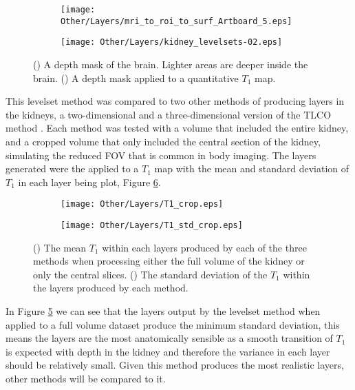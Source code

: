 \begin{figure}[H]
	\centering
	\begin{subfigure}[c]{0.47\textwidth}
		\centering
		\texttt{[image: Other/Layers/mri\_to\_roi\_to\_surf\_Artboard\_5.eps]}
		\caption{}
		\label{fig:layers_brain}
	\end{subfigure}
	\hfill
	\begin{subfigure}[c]{0.47\textwidth}
		\centering
		\texttt{[image: Other/Layers/kidney\_levelsets-02.eps]}
		\caption{}
		\label{fig:layers_kidney}
	\end{subfigure}
	\caption{() A depth mask of the brain. Lighter areas are deeper inside the brain. () A depth mask applied to a quantitative $T_1$ map.}
	\label{fig:layers_example}
\end{figure}

This levelset method was compared to two other methods of producing layers in the kidneys, a two-dimensional and a three-dimensional version of the \ac{TLCO} method \cite{piskunowicz_new_2015, milani_reduction_2017}. Each method was tested with a volume that included the entire kidney, and a cropped volume that only included the central section of the kidney, simulating the reduced \ac{FOV} that is common in body imaging. The layers generated were the applied to a $T_1$ map with the mean and standard deviation of $T_1$ in each layer being plot, Figure \ref{fig:layers_comp}.

\begin{figure}[H]
	\centering
	\begin{subfigure}[c]{0.47\textwidth}
		\centering
		\texttt{[image: Other/Layers/T1\_crop.eps]}
		\caption{}
		\label{fig:layers_t1_comp}
	\end{subfigure}
	\hfill
	\begin{subfigure}[c]{0.47\textwidth}
		\centering
		\texttt{[image: Other/Layers/T1\_std\_crop.eps]}
		\caption{}
		\label{fig:layers_t1_std_comp}
	\end{subfigure}
	\caption{() The mean $T_1$ within each layers produced by each of the three methods when processing either the full volume of the kidney or only the central slices. () The standard deviation of the $T_1$ within the layers produced by each method.}
	\label{fig:layers_comp}
\end{figure}

In Figure \ref{fig:layers_t1_std_comp} we can see that the layers output by the levelset method when applied to a full volume dataset produce the minimum standard deviation, this means the layers are the most anatomically sensible as a smooth transition of $T_1$ is expected with depth in the kidney and therefore the variance in each layer should be relatively small. Given this method produces the most realistic layers, other methods will be compared to it.

